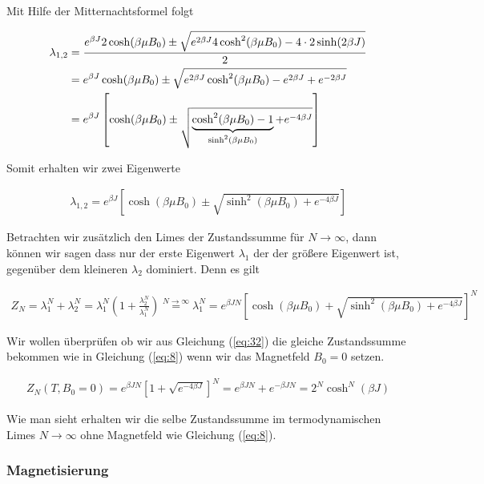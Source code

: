 Mit Hilfe der Mitternachtsformel folgt

\begin{align}
  \label{eq:30}
  \lambda_{1,2} &= \frac{ e^{\beta J}2\cosh(\beta \mu B_0)\pm \sqrt{e^{2\beta J}4\cosh^2(\beta \mu B_0) - 4\cdot 2\sinh(2\beta J)  } }{2} \notag\\
&=  e^{\beta J}\cosh(\beta \mu B_0)\pm \sqrt{e^{2\beta J}\cosh^2(\beta \mu B_0) - e^{2\beta J} + e^{-2\beta J}   }  \notag\\
&=  e^{\beta J}\left[\cosh(\beta \mu B_0)\pm \sqrt{\underbr{\cosh^2(\beta \mu B_0) - 1}_{\sinh^2(\beta \mu B_0)} + e^{-4\beta J}   } \right] 
\end{align}

Somit erhalten wir zwei Eigenwerte

\begin{align}
  \label{eq:31}
 \lambda_{1,2}  =  e^{\beta J}\left[\cosh(\beta \mu B_0)\pm \sqrt{\sinh^2(\beta \mu B_0) + e^{-4\beta J}   } \right]
\end{align}

Betrachten wir zusätzlich den Limes der Zustandssumme für \(N\to\infty\), dann können wir sagen dass nur der erste Eigenwert \(\lambda_1\) der der größere Eigenwert ist, gegenüber dem kleineren \(\lambda_2\) dominiert. Denn es gilt

\begin{align}
  \label{eq:32}
 \boxed{ Z_N = \lambda_1^N + \lambda_2^N = \lambda_1^N\left( 1 + \frac{\lambda_2^N}{\lambda_1^N}  \right) \stackrel{N\to\infty} = \lambda_1^N = e^{\beta J N}\left[\cosh(\beta \mu B_0)+ \sqrt{\sinh^2(\beta \mu B_0) + e^{-4\beta J}   } \right]^N  }
\end{align}

Wir wollen überprüfen ob wir aus Gleichung (\ref{eq:32}) die gleiche Zustandssumme bekommen wie in Gleichung (\ref{eq:8}) wenn wir das Magnetfeld \(B_0=0\) setzen. 

\begin{align}
  \label{eq:33}
  Z_N(T,B_0=0) = e^{\beta J N}\left[1+ \sqrt{ e^{-4\beta J}   } \right]^N = e^{\beta J N}+ e^{-\beta J N} =2^N\cosh^N(\beta J)
\end{align}

Wie man sieht erhalten wir die selbe Zustandssumme im termodynamischen Limes \(N\to\infty\)  ohne Magnetfeld wie Gleichung (\ref{eq:8}).

\subsubsection*{Magnetisierung}

